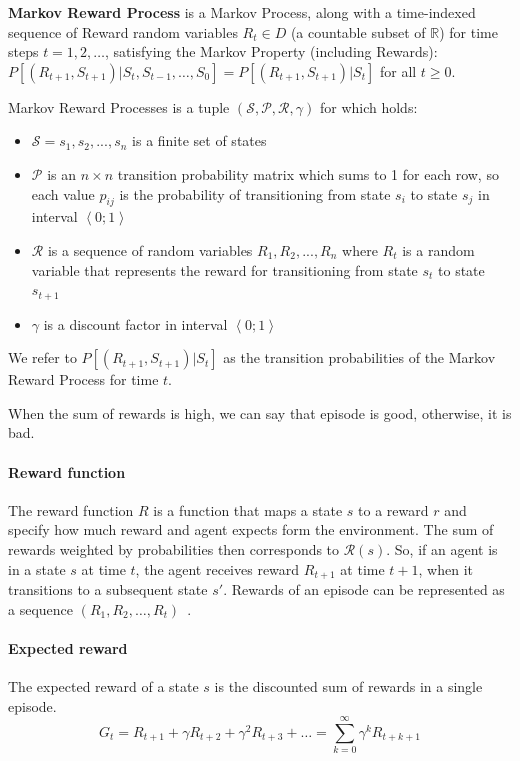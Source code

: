 \documentclass[../xlapes02]{subfiles}
\begin{document}
    \begin{definition}
        \textbf{Markov Reward Process} is a Markov Process, along with a time-indexed sequence of Reward random variables $R_t \in D$ (a countable subset of $\mathbb{R}$) for time steps $t = 1, 2, \ldots$, satisfying the Markov Property (including Rewards): $P[(R_{t+1}, S_{t+1})|S_t, S_{t-1}, \ldots, S_0] = P[(R_{t+1}, S_{t+1})|S_t]$ for all $t \geq 0$.
    \end{definition}

    Markov Reward Processes is a tuple $(\mathcal{S}, \mathcal{P}, \mathcal{R}, \gamma)$ for which holds:
    \begin{itemize}
        \item $\mathcal{S} = s_1, s_2, ..., s_n$ is a finite set of states
        \item $\mathcal{P}$ is an $n\times n$ transition probability matrix which sums to 1 for each row, so each value $p_{ij}$ is the probability of transitioning from state $s_i$ to state $s_j$ in interval $\left< 0;1 \right>$
        \item $\mathcal{R}$ is a sequence of random variables $R_1, R_2, ..., R_n$ where $R_t$ is a random variable that represents the reward for transitioning from state $s_t$ to state $s_{t+1}$
        \item $\gamma$ is a discount factor in interval $\left< 0;1 \right>$
    \end{itemize}

    We refer to $P[(R_{t+1}, S_{t+1})|S_t]$ as the transition probabilities of the Markov Reward Process for time $t$.

    When the sum of rewards is high, we can say that episode is good, otherwise, it is bad.

    \paragraph{Reward function}
    The reward function $R$ is a function that maps a state $s$ to a reward $r$ and specify how much reward and agent expects form the environment.
    The sum of rewards weighted by probabilities then corresponds to $\mathcal{R}(s)$.
    So, if an agent is in a state $s$ at time $t$, the agent receives reward  $R_{t+1}$  at time $t + 1$,  when it transitions to a subsequent state $s'$.
    Rewards of an episode can be represented as a sequence $(R_1, R_2, \ldots, R_t)$~\cite{FITMT25127}.

    \paragraph{Expected reward}
    The expected reward of a state $s$ is the discounted sum of rewards in a single episode.
    \begin{equation}
        G_t = R_{t+1} + \gamma R_{t+2} + \gamma^2 R_{t+3} + \ldots = \sum_{k=0}^{\infty} \gamma^k R_{t+k+1}
    \end{equation}
\end{document}
